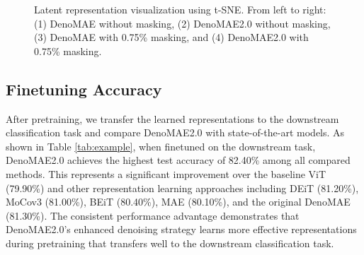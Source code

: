 \begin{figure*}
    \centering
    \hfill
    \hfill
    \hfill
    \caption{Latent representation visualization using t-SNE. From left to right: (1) DenoMAE without masking, (2) DenoMAE2.0 without masking, (3) DenoMAE with 0.75\% masking, and (4) DenoMAE2.0 with 0.75\% masking.}
    \label{fig:tsne} 
\end{figure*}

\subsection{Finetuning Accuracy}

After pretraining, we transfer the learned representations to the downstream classification task and compare DenoMAE2.0 with state-of-the-art models. As shown in Table \ref{tab:example}, when finetuned on the downstream task, DenoMAE2.0 achieves the highest test accuracy of 82.40\% among all compared methods. This represents a significant improvement over the baseline ViT (79.90\%) and other representation learning approaches including DEiT (81.20\%), MoCov3 (81.00\%), BEiT (80.40\%), MAE (80.10\%), and the original DenoMAE (81.30\%). The consistent performance advantage demonstrates that DenoMAE2.0's enhanced denoising strategy learns more effective representations during pretraining that transfers well to the downstream classification task.

\begin{table}[htbp]
    \centering
    \caption{Downstream classification accuracy for different models}
    \label{tab:example}
\end{table}


